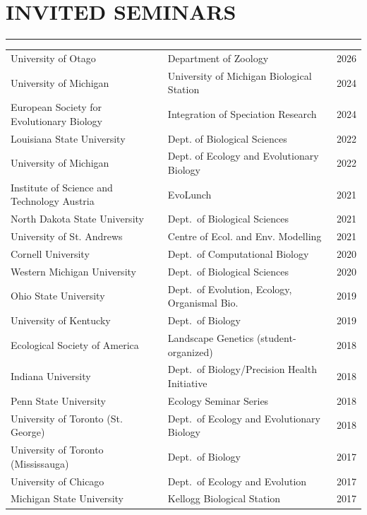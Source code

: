 \documentclass{gbcv}
\begin{document}
\section*{INVITED SEMINARS}
\vspace{-0.6cm}
\rule{470pt}{0.4pt}
%
\begin{longtable}{>{\everypar{\hangindent1cm}}p{}p{}p{}}
University of Otago & Department of Zoology & \hfill 2026\\
%
University of Michigan & University of Michigan Biological Station & \hfill 2024\\
%
European Society for Evolutionary Biology & Integration of Speciation Research & \hfill 2024\\
%
Louisiana State University & Dept. of Biological Sciences & \hfill 2022 \\
%
University of Michigan & Dept. of Ecology and Evolutionary Biology & \hfill 2022 \\
%
Institute of Science and Technology Austria & EvoLunch & \hfill 2021 \\
%
North Dakota State University & Dept.\ of Biological Sciences & \hfill 2021 \\
%
University of St. Andrews & Centre of Ecol. and Env. Modelling & \hfill 2021 \\
%
Cornell University & Dept.\ of Computational Biology & \hfill 2020 \\
%
Western Michigan University & Dept.\ of Biological Sciences & \hfill 2020 \\
%
Ohio State University & Dept.\ of Evolution, Ecology, Organismal Bio. & \hfill 2019 \\
%
University of Kentucky & Dept.\ of Biology & \hfill 2019 \\
%
Ecological Society of America & Landscape Genetics (student-organized) & \hfill 2018 \\
%
Indiana University & Dept.\ of Biology/Precision Health Initiative & \hfill 2018 \\
%
Penn State University & Ecology Seminar Series & \hfill 2018 \\
%
University of Toronto (St. George) & Dept.\ of Ecology and Evolutionary Biology & \hfill 2018 \\
%
University of Toronto (Mississauga) & Dept.\ of Biology & \hfill 2017 \\
%
University of Chicago & Dept.\ of Ecology and Evolution & \hfill 2017 \\
%
Michigan State University & Kellogg Biological Station & \hfill 2017 \\

\end{longtable}
\end{document}
